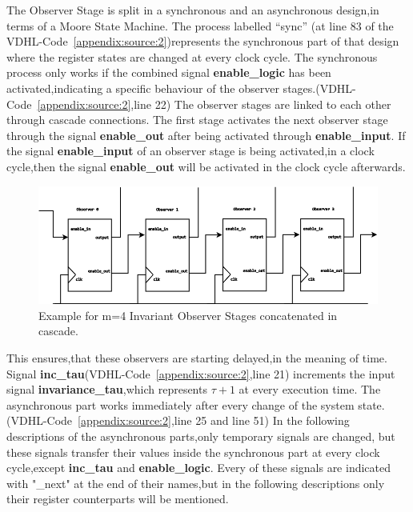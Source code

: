 The Observer Stage is split in a synchronous and an asynchronous design,in terms of a Moore State Machine.
The process labelled ``sync'' (at line 83 of the VDHL-Code~\ref{appendix:source:2})represents the synchronous part of that design where the register states are changed at every clock cycle.
The synchronous process only works if the combined signal \textbf{enable\_logic} has been activated,indicating a specific behaviour of the observer stages.(VDHL-Code~\ref{appendix:source:2},line 22)
The observer stages are linked  to each other through cascade connections. The first stage activates the next observer stage through the signal
\textbf{enable\_out} after being activated through \textbf{enable\_input}.  
If the signal \textbf{enable\_input} of an observer stage is being activated,in a clock cycle,then the signal \textbf{enable\_out} will be activated in the clock cycle afterwards.    
%
\begin{center}
\begin{figure}[h]
\includegraphics[width=450px]{Chapter2/Figs/Raster/Observer-stage.png}
\caption[Invariant Observer stages in cascade , m=4]{Example for m=4 Invariant Observer Stages concatenated in cascade. }
\label{fig:observerstages}
\end{figure}
\end{center}
This ensures,that these observers are starting delayed,in the meaning of time.\\
Signal \textbf{inc\_tau}(VDHL-Code~\ref{appendix:source:2},line 21) increments the input signal \textbf{invariance\_tau},which represents $\tau+1$ at every execution time.
The asynchronous part works immediately after every change of the system state.(VDHL-Code~\ref{appendix:source:2},line 25 and line 51)
In the following descriptions of the asynchronous parts,only temporary signals are changed,
but these signals transfer their values inside the synchronous part at every clock cycle,except \textbf{inc\_tau} and \textbf{enable\_logic}.
Every of these signals are indicated with "\_next" at the end of their names,but in the following descriptions only their register counterparts will be mentioned. 
